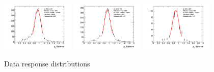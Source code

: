 \begin{figure}[htb!]
    \includegraphics[width=0.31\textwidth]{plots/insitu/fits_data_zmm_nominal/Zmmjet_Nominal_Bin8.png}
    \includegraphics[width=0.31\textwidth]{plots/insitu/fits_data_zmm_nominal/Zmmjet_Nominal_Bin9.png}
    \includegraphics[width=0.31\textwidth]{plots/insitu/fits_data_zmm_nominal/Zmmjet_Nominal_Bin10.png}
    \caption{Data \zmmjet response distributions \label{fig:App:zmmdatafits}}
\end{figure}

